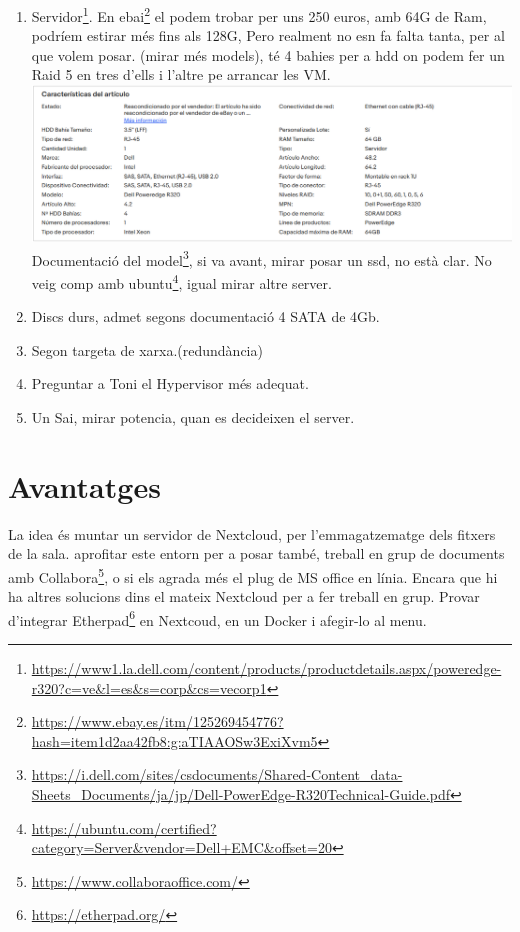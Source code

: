 \documentclass[
  10pt,
]{krantz}
\DeclareRobustCommand{\href}[2]{#2\footnote{\url{#1}}}
\providecommand{\tightlist}{%
  \setlength{\itemsep}{0pt}\setlength{\parskip}{0pt}}
\begin{document}
\begin{enumerate}
\def\labelenumi{\arabic{enumi}.}
\tightlist
\item
  \href{https://www1.la.dell.com/content/products/productdetails.aspx/poweredge-r320?c=ve\&l=es\&s=corp\&cs=vecorp1}{Servidor}. En \href{https://www.ebay.es/itm/125269454776?hash=item1d2aa42fb8:g:aTIAAOSw3ExiXvm5}{ebai} el podem trobar per uns 250 euros, amb 64G de Ram, podríem estirar més fins als 128G, Pero realment no esn fa falta tanta, per al que volem posar. (mirar més models), té 4 bahies per a hdd on podem fer un Raid 5 en tres d'ells i l'altre pe arrancar les VM. \includegraphics{imatges/server_hp.png} \href{https://i.dell.com/sites/csdocuments/Shared-Content_data-Sheets_Documents/ja/jp/Dell-PowerEdge-R320Technical-Guide.pdf}{Documentació del model}, si va avant, mirar posar un ssd, no està clar. No veig comp amb \href{https://ubuntu.com/certified?category=Server\&vendor=Dell+EMC\&offset=20}{ubuntu}, igual mirar altre server.
\item
  Discs durs, admet segons documentació 4 SATA de 4Gb.
\item
  Segon targeta de xarxa.(redundància)
\item
  Preguntar a Toni el Hypervisor més adequat.
\item
  Un Sai, mirar potencia, quan es decideixen el server.
\end{enumerate}

\hypertarget{avantatges}{%
\section{Avantatges}\label{avantatges}}

La idea és muntar un servidor de Nextcloud, per l'emmagatzematge dels fitxers de la sala. aprofitar este entorn per a posar també, treball en grup de documents amb \href{https://www.collaboraoffice.com/}{Collabora}, o si els agrada més el plug de MS office en línia. Encara que hi ha altres solucions dins el mateix Nextcloud per a fer treball en grup. Provar d'integrar \href{https://etherpad.org/}{Etherpad} en Nextcoud, en un Docker i afegir-lo al menu.
\end{document}
